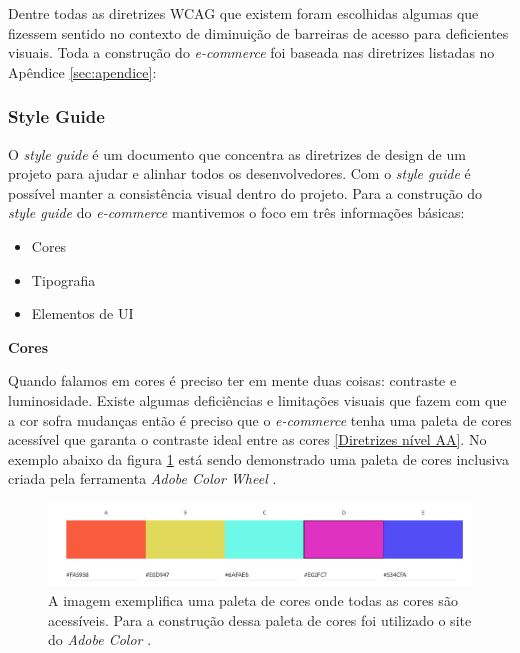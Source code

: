 {Dentre todas as diretrizes WCAG \cite{WCAG21} que existem foram escolhidas algumas que fizessem sentido no contexto de diminuição de barreiras de acesso para deficientes visuais. Toda a construção do \textit{e-commerce} foi baseada nas diretrizes listadas no Apêndice \ref{sec:apendice}: 

}

\newpage
\subsubsection{Style Guide}
{O \textit{style guide} \cite{STYLE} é um documento que concentra as diretrizes de design de um projeto para ajudar e alinhar todos os desenvolvedores. Com o \cite{STYLE}{\textit{style guide}} é possível manter a consistência visual dentro do projeto. Para a construção do \cite{STYLE}{\textit{style guide}} do \textit{e-commerce} mantivemos o foco em três informações básicas:
\begin{itemize}
    \item Cores
    \item Tipografia
    \item Elementos de UI
\end{itemize}

{\centerline{\textbf{Cores}}}
Quando falamos em cores é preciso ter em mente duas coisas: contraste e luminosidade. Existe algumas deficiências e limitações visuais que fazem com que a cor sofra mudanças então é preciso que o \textit{e-commerce} tenha uma paleta de cores acessível que garanta o contraste ideal entre as cores \ref{Diretrizes nível AA}. No exemplo abaixo da figura \ref{fig1:style} está sendo demonstrado uma paleta de cores inclusiva criada pela ferramenta \textit{Adobe Color Wheel} \cite{ADOBE} . 
\begin{figure}[ht]
  		\centering
        \includegraphics[width=1.0\textwidth]{images/paleta_de_cores_acessiveis.png}
        \caption{A imagem exemplifica uma paleta de cores onde todas as cores são acessíveis. Para a construção dessa paleta de cores foi utilizado o site do \textit{Adobe Color} \cite{ADOBE}.}
        \label{fig1:style}
\end{figure}  

}
